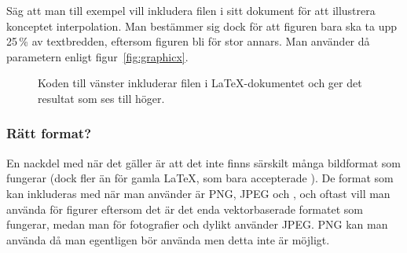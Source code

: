 \documentclass[../../latex.tex]{subfiles}
\begin{document}
Säg att man till exempel vill inkludera filen 
i sitt dokument för att illustrera konceptet interpolation. Man bestämmer
sig dock för att figuren bara ska ta upp 25\,\% av textbredden, eftersom
figuren bli för stor annars. Man använder då parametern 
enligt figur~\vref{fig:graphicx}.%

\begin{figure}[tbp]
	\centering
	\hspace{-0.025\textwidth}
	\begin{minipage}{0.475\textwidth} %
	\end{minipage}
	\hfil
	\begin{minipage}{0.475\textwidth} %
	\end{minipage}
	\caption{Koden till vänster inkluderar filen  i
	\LaTeX-dokumentet och ger det resultat som ses till höger.}
	\label{fig:graphicx}
\end{figure}

\subsubsection{Rätt format?}
En nackdel med \pdfLaTeX{} när det gäller  är att det inte
finns särskilt många bildformat som fungerar (dock fler än för gamla
\LaTeX{}, som bara accepterade \EPS). De format som kan inkluderas
med  när man använder \pdfLaTeX{} är \textsc{PNG},
\textsc{JPEG} och \PDF, och oftast vill man använda \PDF{} för figurer
eftersom
det är det enda vektorbaserade formatet som fungerar, medan man för
fotografier och dylikt använder \textsc{JPEG}. \textsc{PNG} kan man
använda då man egentligen bör använda \PDF{} men detta inte är möjligt.
\end{document}
